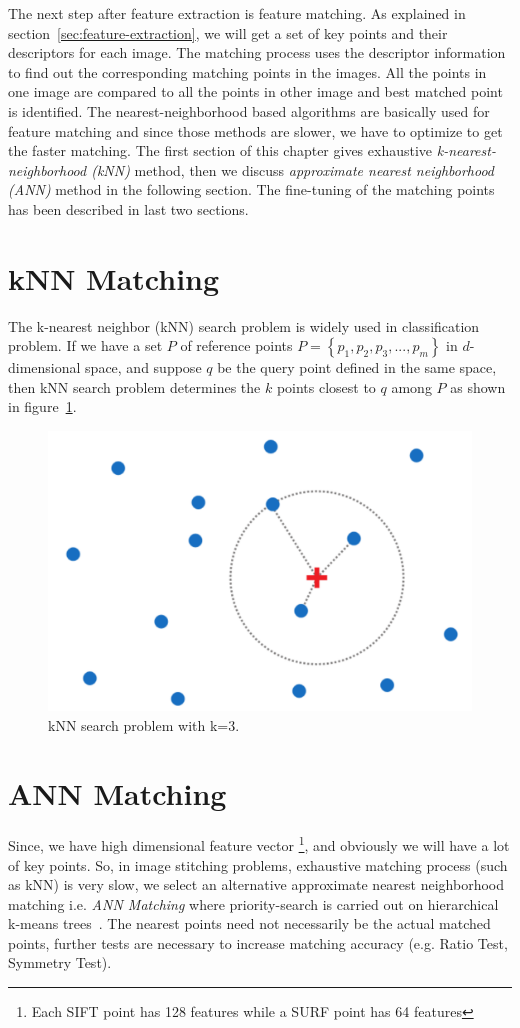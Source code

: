 The next step after feature extraction is feature matching. As explained in section~\ref{sec:feature-extraction}, we will get a set of key points and their descriptors for each image. The matching process uses the descriptor information to find out the corresponding matching points in the images. All the points in one image are compared to all the points in other image and best matched point is identified. The nearest-neighborhood based algorithms are basically used for feature matching and since those methods are slower, we have to optimize to get the faster matching. The first section of this chapter gives exhaustive \emph{k-nearest-neighborhood (kNN)} method, then we discuss \emph{approximate nearest neighborhood (ANN)} method in the following section. The fine-tuning of the matching points has been described in last two sections.    

\section{kNN Matching}
\label{sec:knn-matching}
 The k-nearest neighbor (kNN) search problem is widely used in classification problem. If we have a set $P$ of reference points $P=\left\{ p_1,p_2, p_3,...,p_m \right\}$ in $d$-dimensional space, and suppose $q$ be the query point defined in the same space, then kNN search problem determines the $k$ points closest to $q$ among $P$ as shown in figure~\ref{fig:knn-search}.  

\begin{figure}%
\centering
\includegraphics[width=0.6\columnwidth]{2.mainmatter/2.Methodology/figures/Knn}%
\caption[kNN Search]{kNN search problem with k=3. }%
\label{fig:knn-search}%
\end{figure}

\section{ANN Matching}
\label{section:ann-matching}
Since, we have high dimensional feature vector \footnote{Each SIFT point has 128 features while a SURF point has 64 features}, and obviously we will have a lot of key points. So, in image stitching problems, exhaustive matching process (such as kNN) is very slow, we select an alternative approximate nearest neighborhood matching i.e. \emph{ANN Matching} where priority-search is carried out on hierarchical k-means trees~\cite{muja:09}. The nearest points need not necessarily be the actual matched points, further tests are necessary to increase matching accuracy (e.g. Ratio Test, Symmetry Test).\\

